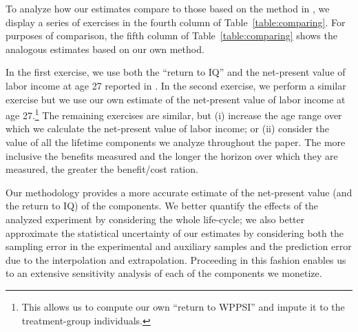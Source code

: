 To analyze how our estimates compare to those based on the method in \citet{Kline_Walters_2016_QJE}, we display a series of exercises in the fourth column of Table~\ref{table:comparing}. For purposes of comparison, the fifth column of Table~\ref{table:comparing} shows the analogous estimates based on our own method.

In the first exercise, we use both the ``return to IQ'' and the net-present value of labor income at age 27 reported in  \citet{Chetty_Friedman_etal_2011_QJoE}. In the second exercise, we perform a similar exercise but we use our own estimate of the net-present value of labor income at age 27.\footnote{This allows us to compute our own ``return to WPPSI'' and impute it to the treatment-group individuals.} The remaining exercises are similar, but (i) increase the age range over which we calculate the net-present value of labor income; or (ii) consider the value of all the lifetime components we analyze throughout the paper. The more inclusive the benefits measured and the longer the horizon over which they are measured, the greater the benefit/cost ration.

Our methodology provides a more accurate estimate of the net-present value (and the return to IQ) of the components. We better quantify the effects of the analyzed experiment by considering the whole life-cycle; we also better approximate the statistical uncertainty of our estimates by considering both the sampling error in the experimental and auxiliary samples and the prediction error due to the interpolation and extrapolation. Proceeding in this fashion enables us to an extensive sensitivity analysis of each of the components we monetize. 